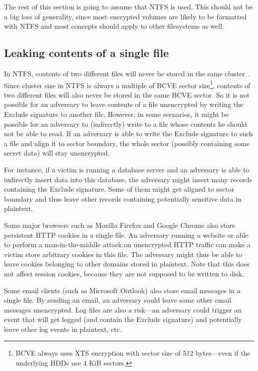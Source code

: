 \documentclass[11pt]{article}
\begin{document}
The rest of this section is going to assume that NTFS is used. This should not be a big loss of generality, since most encrypted volumes are likely to be formatted with NTFS and most concepts should apply to other filesystems as well.

\subsection{Leaking contents of a single file}

In NTFS, contents of two different files will never be stored in the same cluster~\cite{russinovich}. Since cluster size in NTFS is always a multiple of BCVE sector size\footnote{BCVE always uses XTS encryption with sector size of 512 bytes---even if the underlying HDDs use 4 KiB sectors.}, contents of two different files will also never be stored in the same BCVE sector. So it is not possible for an adversary to leave contents of a file unencrypted by writing the Exclude signature to another file. However, in some scenarios, it might be possible for an adversary to (indirectly) write to a file whose contents he should not be able to read. If an adversary is able to write the Exclude signature to such a file and align it to sector boundary, the whole sector (possibly containing some secret data) will stay unencrypted. 

For instance, if a victim is running a database server and an adversary is able to indirectly insert data into this database, the adversary might insert many records containing the Exclude signature. Some of them might get aligned to sector boundary and thus leave other records containing potentially sensitive data in plaintext.

Some major browsers such as Mozilla Firefox and Google Chrome also store persistent HTTP cookies in a single file. An adversary running a website or able to perform a man-in-the-middle attack on unencrypted HTTP traffic can make a victim store arbitrary cookies in this file. The adversary might thus be able to leave cookies belonging to other domains stored in plaintext. Note that this does not affect session cookies, because they are not supposed to be written to disk.

Some email clients (such as Microsoft Outlook) also store email messages in a single file. By sending an email, an adversary could leave some other email messages unencrypted. Log files are also a risk---an adversary could trigger an event that will get logged (and contain the Exclude signature) and potentially leave other log events in plaintext, etc.
\end{document}
